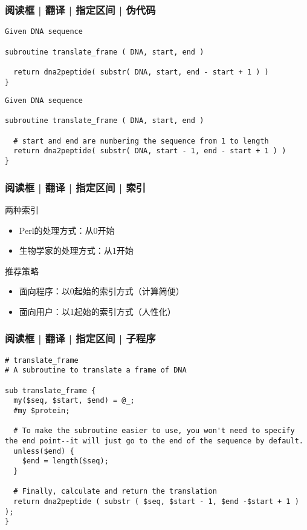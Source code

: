 \begin{frame}[fragile]
  \frametitle{阅读框 | 翻译 | 指定区间 | 伪代码}
\begin{lstlisting}[basicstyle=\footnotesize\tt,numberstyle=\scriptsize]
Given DNA sequence

subroutine translate_frame ( DNA, start, end )

  return dna2peptide( substr( DNA, start, end - start + 1 ) )
}
\end{lstlisting}
\pause
\begin{lstlisting}[basicstyle=\footnotesize\tt,numberstyle=\scriptsize]
Given DNA sequence

subroutine translate_frame ( DNA, start, end )

  # start and end are numbering the sequence from 1 to length
  return dna2peptide( substr( DNA, start - 1, end - start + 1 ) )
}
\end{lstlisting}
\end{frame}

\begin{frame}[fragile]
  \frametitle{阅读框 | 翻译 | 指定区间 | \alert{索引}}
  \begin{block}{两种索引}
    \begin{itemize}
      \item Perl的处理方式：从0开始
      \item 生物学家的处理方式：从1开始
    \end{itemize}
  \end{block}
  \pause
  \begin{block}{推荐策略}
    \begin{itemize}
      \item 面向程序：以0起始的索引方式（计算简便）
      \item 面向用户：以1起始的索引方式（人性化）
    \end{itemize}
  \end{block}
\end{frame}

\begin{frame}[fragile]
  \frametitle{阅读框 | 翻译 | 指定区间 | \alert{子程序}}
\begin{lstlisting}[basicstyle=\footnotesize\tt,numberstyle=\scriptsize]
# translate_frame
# A subroutine to translate a frame of DNA

sub translate_frame {
  my($seq, $start, $end) = @_;
  #my $protein;

  # To make the subroutine easier to use, you won't need to specify the end point--it will just go to the end of the sequence by default.
  unless($end) {
    $end = length($seq);
  }

  # Finally, calculate and return the translation
  return dna2peptide ( substr ( $seq, $start - 1, $end -$start + 1 ) );
}
\end{lstlisting}
\end{frame}

